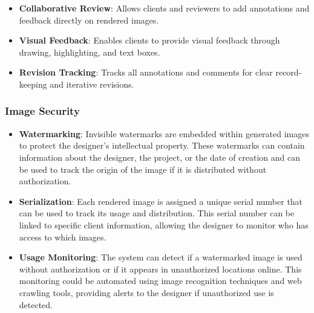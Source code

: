 \documentclass[12pt]{article}
\begin{document}
\begin{itemize}
    \item \textbf{Collaborative Review}: Allows clients and reviewers to add annotations and feedback directly on rendered images.
    \item \textbf{Visual Feedback}: Enables clients to provide visual feedback through drawing, highlighting, and text boxes.
    \item \textbf{Revision Tracking}: Tracks all annotations and comments for clear record-keeping and iterative revisions.
\end{itemize}


\subsubsection{Image Security}
\begin{itemize}
\item \textbf{Watermarking}: Invisible watermarks are embedded within generated images to protect the designer's intellectual property. These watermarks can contain information about the designer, the project, or the date of creation and can be used to track the origin of the image if it is distributed without authorization.
\item \textbf{Serialization}: Each rendered image is assigned a unique serial number that can be used to track its usage and distribution. This serial number can be linked to specific client information, allowing the designer to monitor who has access to which images.
\item \textbf{Usage Monitoring}: The system can detect if a watermarked image is used without authorization or if it appears in unauthorized locations online. This monitoring could be automated using image recognition techniques and web crawling tools, providing alerts to the designer if unauthorized use is detected.
\end{itemize}
\end{document}
